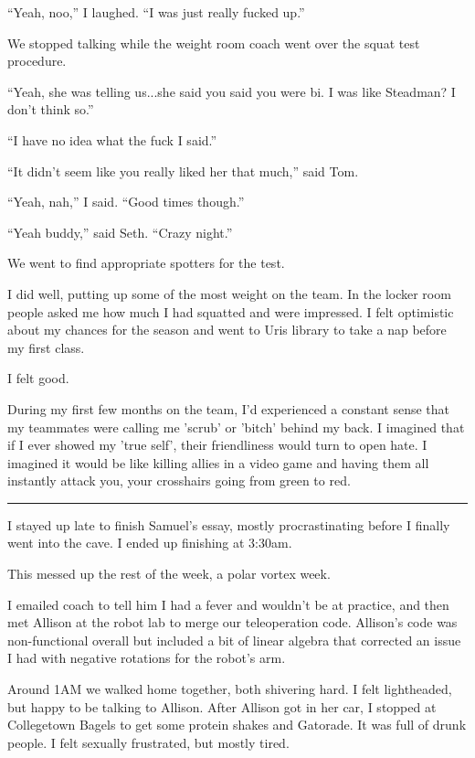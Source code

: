 ``Yeah, noo,'' I laughed. ``I was just really fucked up.''

We stopped talking while the weight room coach went over the squat test
procedure. 

``Yeah, she was telling us...she said you said you were bi.  I was like
Steadman?  I don't think so.''

``I have no idea what the fuck I said.''

``It didn't seem like you really liked her that much,'' said Tom.

``Yeah, nah,'' I said.  ``Good times though.''

``Yeah buddy,'' said Seth.  ``Crazy night.'' 

We went to find appropriate spotters for the test.

I did well, putting up some of the most weight on the team.  In the locker room
people asked me how much I had squatted and were impressed.  I felt optimistic
about my chances for the season and went to Uris library to take a nap before my
first class.

I felt good.

During my first few months on the team, I'd experienced a constant sense that my
teammates were calling me 'scrub' or 'bitch' behind my back.  I imagined that if
I ever showed my 'true self', their friendliness would turn to open hate.  I
imagined it would be like killing allies in a video game and having them all
instantly attack you, your crosshairs going from green to red. 

\plainfancybreak{12pt}{2}{* * *}

I stayed up late to finish Samuel's essay, mostly procrastinating before I
finally went into the cave.  I ended up finishing at 3:30am.

This messed up the rest of the week, a polar vortex week.

I emailed coach to tell him I had a fever and wouldn't be at practice, and then
met Allison at the robot lab to merge our teleoperation code.   Allison's code
was non-functional overall but included a bit of linear algebra that corrected
an issue I had with negative rotations for the robot's arm.

Around 1AM we walked home together, both shivering hard.  I felt lightheaded,
but happy to be talking to Allison.  After Allison got in her car, I stopped at
Collegetown Bagels to get some protein shakes and Gatorade.  It was full of
drunk people.  I felt sexually frustrated, but mostly tired.

